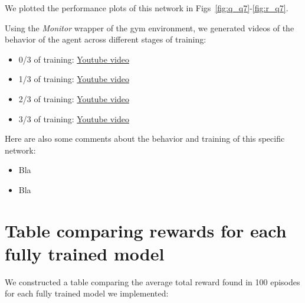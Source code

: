 \documentclass{article}
\begin{document}
We plotted the performance plots of this network in Figs~\ref{fig:q_q7}-\ref{fig:r_q7}.



Using the \textit{Monitor} wrapper of the gym environment, we generated videos of the behavior of the agent across different stages of training:

\begin{itemize}
  \item 0/3 of training: \href{http://www.sharelatex.com}{Youtube video}
  \item 1/3 of training: \href{http://www.sharelatex.com}{Youtube video}
  \item 2/3 of training: \href{http://www.sharelatex.com}{Youtube video}
  \item 3/3 of training: \href{http://www.sharelatex.com}{Youtube video}
\end{itemize}

Here are also some comments about the behavior and training of this specific network:

\begin{itemize}
  \item Bla
  \item Bla
\end{itemize}

\section{Table comparing rewards for each fully trained model} %
\label{sec:table_comparing_rewards_for_each_fully_trained_model}
We constructed a table comparing the average total reward found in 100 episodes for each fully trained model we implemented:
\end{document}
